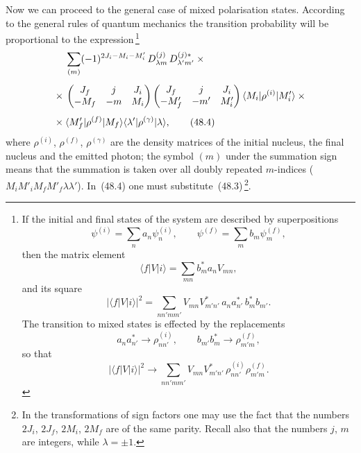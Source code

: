 Now we can proceed to the general case of mixed polarisation states. According to the general rules of quantum mechanics the transition probability will be proportional to the expression\,\footnote{If the initial and final states of the system are described by superpositions
\[
\psi^{(i)} = \sum_n a_n\psi^{(i)}_n, \qquad \psi^{(f)} = \sum_m b_m\psi^{(f)}_m,
\]
then the matrix element
\[
\langle f|V|i\rangle = \sum_{mn} b^*_m a_n V_{mn},
\]
and its square
\[
|\langle f|V|i\rangle|^2 = \sum_{nn'mm'} V_{mn}V^*_{m'n'}\,a_n a^*_{n'}\,b^*_m b_{m'}.
\]
The transition to mixed states is effected by the replacements
\[
a_n a^*_{n'} \to \rho^{(i)}_{nn'},\qquad b_{m'}b^*_m \to \rho^{(f)}_{m'm},
\]
so that
\[
|\langle f|V|i\rangle|^2 \to \sum_{nn'mm'} V_{mn}V^*_{m'n'}\,\rho^{(i)}_{nn'}\rho^{(f)}_{m'm}.
\]}
\begin{align}
&\sum_{(m)}(-1)^{2J_i - M_i - M'_i}\,D^{(j)}_{\lambda m}\,D^{(j)*}_{\lambda'm'}\times{}\notag\\[4pt]
{}\times{}&\begin{pmatrix} J_f & j & J_i \\ -M_f & -m & M_i\end{pmatrix}
\begin{pmatrix} J_f & j & J_i \\ -M'_f & -m' & M'_i\end{pmatrix}
\langle M_i|\rho^{(i)}|M'_i\rangle\times{}\notag\\[4pt]
{}\times{}&\langle M'_f|\rho^{(f)}|M_f\rangle\langle\lambda'|\rho^{(\gamma)}|\lambda\rangle,
\tag{48.4}
\end{align}
where $\rho^{(i)}$, $\rho^{(f)}$, $\rho^{(\gamma)}$ are the density matrices of the initial nucleus, the final nucleus and the emitted photon; the symbol $(m)$ under the summation sign means that the summation is taken over all doubly repeated $m$-indices ($M_i M'_i M_f M'_f\lambda\lambda'$). In~(48.4) one must substitute~(48.3)\,\footnote{In the transformations of sign factors one may use the fact that the numbers $2J_i$, $2J_f$, $2M_i$, $2M_f$ are of the same parity. Recall also that the numbers $j$, $m$ are integers, while $\lambda = \pm 1$.}.

